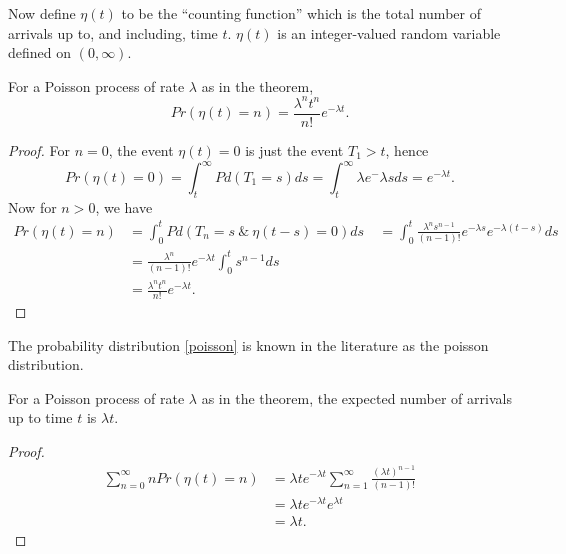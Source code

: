 \documentclass[12pt,leqno]{article}
\begin{document}
Now define $\eta(t)$ to be the ``counting function'' which is the total number of arrivals up to, and including, time $t$. $\eta(t)$
is an integer-valued random variable defined on $(0,\infty)$.
\begin{Cor}
  For a Poisson process of rate $\lambda$ as in the theorem, 
  \begin{equation}\label{poisson}
  Pr(\eta(t) = n) = \frac{\lambda^nt^{n}}{n!}e^{-\lambda{t}}.
  \end{equation}
  \begin{proof}
    For $n = 0$, the event $\eta(t) = 0$ is just the event $T_1 > t$, hence
    $$
    Pr(\eta(t) = 0) = \int_t^{\infty}Pd(T_1 = s)ds = \int_t^{\infty}{\lambda}e^-{\lambda{s}}ds = e^{-\lambda{t}}.
    $$
    Now for $n > 0$, we have
    \begin{align*}
      Pr(\eta(t) = n) &= \int_0^tPd(T_n = s ~\&~ \eta(t-s) = 0)ds\
      &= \int_0^t\frac{\lambda^ns^{n-1}}{(n-1)!}e^{-\lambda{s}}e^{-\lambda(t-s)}ds\\
      &=\frac{\lambda^n}{(n-1)!}e^{-\lambda{t}}\int_0^t s^{n-1}ds\\
      &= \frac{\lambda^nt^{n}}{n!}e^{-\lambda{t}}.
    \end{align*}
  \end{proof}
\end{Cor}
The probability distribution \eqref{poisson} is known in the literature as the poisson distribution.

\begin{Cor}
  For a Poisson process of rate $\lambda$ as in the theorem, 
  the expected number of arrivals up to time $t$ is $\lambda{t}$.
  \begin{proof}
    \begin{align*}
      \sum_{n=0}^{\infty}nPr(\eta(t) = n) &= \lambda{t}e^{-\lambda{t}}\sum_{n=1}^{\infty}\frac{(\lambda{t})^{n-1}}{(n-1)!}\\
      &=\lambda{t}e^{-\lambda{t}}e^{\lambda{t}}\\
      &= \lambda{t}.
    \end{align*}
  \end{proof}
\end{Cor}
        
   
\end{document}
